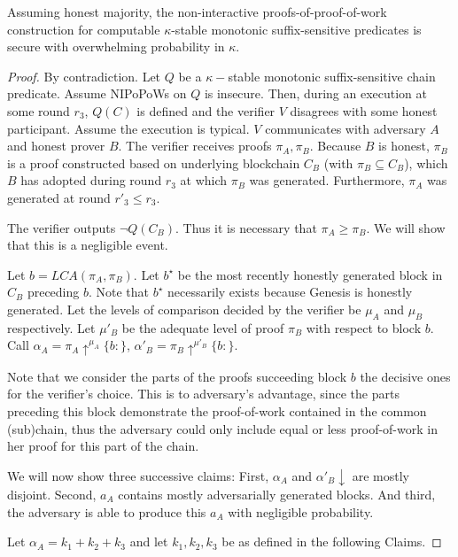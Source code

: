 \begin{thm}
	Assuming honest majority, the non-interactive
	proofs-of-proof-of-work construction for computable $\kappa$-stable monotonic
	suffix-sensitive predicates is secure with overwhelming probability in $\kappa$.
	\label{thm:original_suffix_security}
\end{thm}
\begin{proof}
	By contradiction. Let $Q$ be a $\kappa-$stable monotonic
	suffix-sensitive chain predicate. Assume NIPoPoWs on $Q$ is insecure. Then,
	during an execution at some round  $r_3$, $Q(C)$ is defined and the verifier
	$V$ disagrees with some honest participant. Assume the execution is typical.
	$V$ communicates with adversary $A$ and honest prover $B$. The verifier receives
	proofs $\pi_A, \pi_B$. Because $B$ is honest, $\pi_B$ is a proof constructed
	based on underlying blockchain $C_B$ (with $\pi_B \subseteq C_B$), which $B$
	has adopted during round $r_3$ at which $\pi_B$ was generated. Furthermore,
	$\pi_A$ was generated at round $r'_3 \leq r_3$.

	The verifier outputs $\neg Q(C_B)$. Thus it is necessary that $\pi_A \geq 
	\pi_B$. We will show that this is a negligible event.

	Let $b = LCA(\pi_A, \pi_B)$. Let $b^\star$ be the most recently honestly
	generated block in $C_B$ preceding $b$. Note that $b^\star$ necessarily
	exists because Genesis is honestly generated. Let the levels of comparison
	decided by the verifier be $\mu_A$ and $\mu_B$ respectively. Let $\mu'_B$
	be the adequate level of proof $\pi_B$  with respect to block $b$. Call
	$\alpha_A = \pi_A \uparrow^{\mu_A}\{b:\}$,
	$\alpha'_B = \pi_B \uparrow^{\mu'_B}\{b:\}$.

	Note that we consider the parts of the proofs succeeding block $b$ the decisive ones 
	for the verifier's choice. This is to adversary's advantage, since the parts 
	preceding this block demonstrate the proof-of-work contained in the common 
	(sub)chain, thus the adversary could only include equal or less proof-of-work
	in her proof for this part of the chain.

	We will now show three successive claims: First, $\alpha_A$ and $\alpha'_B \downarrow$
	are mostly disjoint. Second, $a_A$ contains mostly adversarially generated blocks.
	And third, the adversary is able to produce this $a_A$ with negligible probability.

	Let $\alpha_A = k_1 + k_2 + k_3$ and let $k_1, k_2, k_3$ be as defined in the
	following Claims.


\end{proof}
